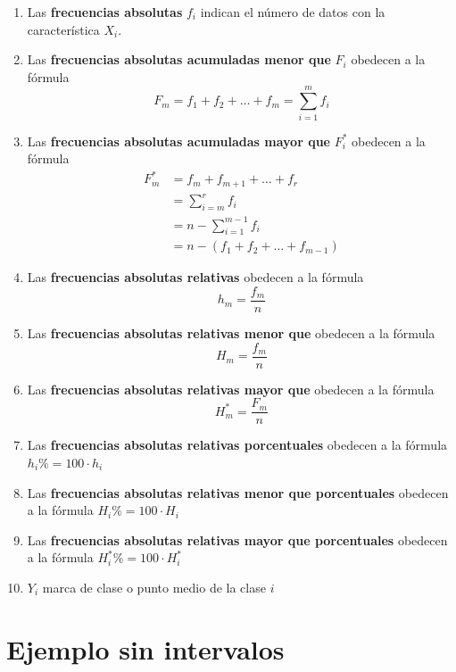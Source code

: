 \documentclass[10pt,]{krantz}
\theoremstyle{definition}
\theoremstyle{definition}
\theoremstyle{definition}
\theoremstyle{definition}
\theoremstyle{remark}
\begin{document}
\begin{enumerate}
\def\labelenumi{\arabic{enumi}.}
\item
  Las \textbf{frecuencias absolutas} \(f_i\) indican el número de datos con la característica \(X_i\).
\item
  Las \textbf{frecuencias absolutas acumuladas menor que} \(F_i\) obedecen a la fórmula \[F_m=f_1+f_2+\ldots+f_m=\sum_{i=1}^mf_i\]
\item
  Las \textbf{frecuencias absolutas acumuladas mayor que} \(F_i^*\) obedecen a la fórmula \[
  \begin{aligned}
  F_m^*&=f_m+f_{m+1}+\ldots+f_r\\
  &=\sum_{i=m}^rf_i\\
  &=n-\sum_{i=1}^{m-1}f_i\\
  &=n-\left(f_1+f_{2}+\ldots+f_{m-1}\right)
  \end{aligned} 
  \]
\item
  Las \textbf{frecuencias absolutas relativas} obedecen a la fórmula \[h_m=\frac{f_m}{n}\]
\item
  Las \textbf{frecuencias absolutas relativas menor que} obedecen a la fórmula \[H_m=\frac{f_m}{n}\]
\item
  Las \textbf{frecuencias absolutas relativas mayor que} obedecen a la fórmula \[H_m^*=\frac{F_m}{n}\]
\item
  Las \textbf{frecuencias absolutas relativas porcentuales} obedecen a la fórmula \(h_i\%=100\cdot h_i\)
\item
  Las \textbf{frecuencias absolutas relativas menor que porcentuales} obedecen a la fórmula \(H_i\%=100\cdot H_i\)
\item
  Las \textbf{frecuencias absolutas relativas mayor que porcentuales} obedecen a la fórmula \(H_i^*\%=100\cdot H_i^*\)
\item
  \(Y_i\) marca de clase o punto medio de la clase \(i\)
\end{enumerate}

\hypertarget{ejemplo-sin-intervalos}{%
\section{Ejemplo sin intervalos}\label{ejemplo-sin-intervalos}}
\end{document}
